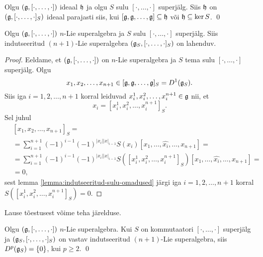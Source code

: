 \begin{lau}
    Olgu $(\mathfrak{g}, [\cdot, \dots, \cdot])$ ideaal $\mathfrak{h}$ ja olgu
    $S$ sulu $[\cdot, \dots, \cdot]$ superjälg. Siis $\mathfrak{h}$ on
    $(\mathfrak{g}, [\cdot, \dots, \cdot]_S)$ ideaal parajasti siis, kui
    $[\mathfrak{g}, \mathfrak{g}, \dots, \mathfrak{g}] \subseteq \mathfrak{h}$ või $\mathfrak{h} \subseteq \ker S$.
    \hfill \qed
\end{lau}

\begin{lau}
    Olgu $(\mathfrak{g}, [\cdot, \dots, \cdot])$ $n$-Lie superalgebra ja
    $S$ sulu $[\cdot, \dots, \cdot]$ superjälg. Siis indutseeritud
    $(n+1)$-Lie superalgebra $(\mathfrak{g}_S, [\cdot, \dots, \cdot]_S)$
    on lahenduv.
\end{lau}

\begin{proof}
    Eeldame, et $(\mathfrak{g}, [\cdot, \dots, \cdot])$ on $n$-Lie
    superalgebra ja $S$ tema sulu $[\cdot, \dots, \cdot]$ superjälg.
    Olgu
    \[
        x_1, x_2, \dots, x_{n+1} \in
        [\mathfrak{g}, \mathfrak{g}, \dots, \mathfrak{g}]_S = D^1(\mathfrak{g}_S).
    \]
    Siis iga $i = 1, 2, \dots, n+1$ korral leiduvad
    $x_i^1, x_i^2, \dots, x_i^{n+1} \in \mathfrak{g}$ nii, et
    \[
        x_i = [x_i^1, x_i^2, \dots, x_i^{n+1}]_S.
    \]
    Sel juhul
    \begin{align*}
        &[x_1, x_2, \dots, x_{n+1}]_S = \\
        &= \sum_{i=1}^{n+1} (-1)^{i-1} (-1)^{|x_i||x|_{i-1}}
            S(x_i) [x_1, \dots, \hat{x_i}, \dots, x_{n+1}] = \\
        &= \sum_{i=1}^{n+1} (-1)^{i-1} (-1)^{|x_i||x|_{i-1}}
            S([x_i^1, x_i^2, \dots, x_i^{n+1}]_S)
            [x_1, \dots, \hat{x_i}, \dots, x_{n+1}] = \\
        &= 0,
    \end{align*}
    sest lemma \ref{lemma:indutseeritud-sulu-omadused} järgi
    iga $i = 1, 2, \dots, n+1$ korral
    $S([x_i^1, x_i^2, \dots, x_i^{n+1}]_S) = 0$.
\end{proof}

Lause tõestusest võime teha järelduse.

\begin{jar}
    Olgu $(\mathfrak{g}, [\cdot, \dots, \cdot])$ $n$-Lie superalgebra. Kui $S$ on
    kommutaatori $[\cdot, \dots, \cdot]$ superjälg ja
    $(\mathfrak{g}_S, [\cdot, \dots, \cdot]_S)$ on
    vastav indutseeritud $(n+1)$-Lie superalgebra, siis
    $D^p(\mathfrak{g}_S) = \{0\}$, kui $p \geq 2$. \hfill \qed
\end{jar}


